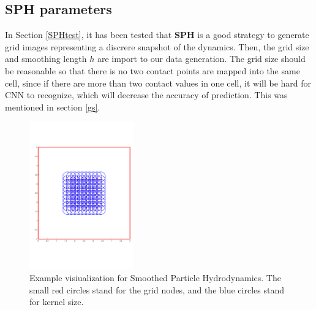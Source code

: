 \subsection{SPH parameters}
    \label{SPH-setting}
    In Section \ref{SPHtest}, it has been tested that \textbf{SPH} is a good strategy to generate grid images representing a discrere snapshot of the dynamics. Then, the grid size and smoothing length $h$ are import to our data generation. The grid size should be reasonable so that there is no two contact points are mapped into the same cell, since if there are more than two contact values in one cell, it will be hard for CNN to recognize, which will decrease the accuracy of prediction. This was mentioned in section \ref{gs}.
    \begin{figure}[!h]
        \centering
        \includegraphics[width=0.4\textwidth]{Figures/SPHvi.pdf}
        \caption{Example visiualization for Smoothed Particle Hydrodynamics. The small red circles stand for the grid nodes, and the blue circles stand for kernel size.}
    \end{figure}

